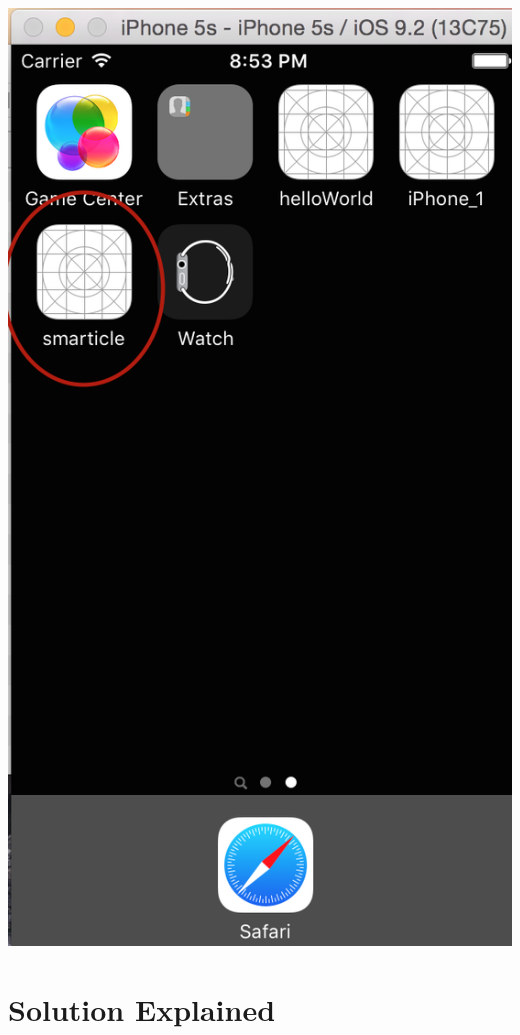 \documentclass[11pt, margin=1in]{article}
\begin{document}
\begin{center}
\includegraphics[scale=0.5]{13.jpg}
\end{center}

\newpage
\section{Solution Explained}
\end{document}
